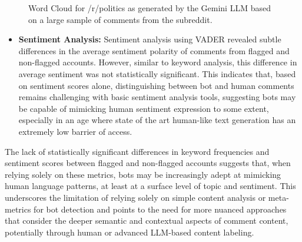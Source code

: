 \documentclass[
  12pt,
  letterpaper,
  DIV=11,
  numbers=noendperiod,
  abstract]{scrartcl}
\providecommand{\tightlist}{%
  \setlength{\itemsep}{0pt}\setlength{\parskip}{0pt}}\usepackage{longtable,booktabs,array}
\begin{document}
\begin{figure}


\caption{\label{fig-polwc}Word Cloud for /r/politics as generated by the
Gemini LLM based on a large sample of comments from the subreddit.}

\end{figure}%

\begin{itemize}
\tightlist
\item
  \textbf{Sentiment Analysis:} Sentiment analysis using VADER revealed
  subtle differences in the average sentiment polarity of comments from
  flagged and non-flagged accounts. However, similar to keyword
  analysis, this difference in average sentiment was not statistically
  significant. This indicates that, based on sentiment scores alone,
  distinguishing between bot and human comments remains challenging with
  basic sentiment analysis tools, suggesting bots may be capable of
  mimicking human sentiment expression to some extent, especially in an
  age where state of the art human-like text generation has an extremely
  low barrier of access.
\end{itemize}

The lack of statistically significant differences in keyword frequencies
and sentiment scores between flagged and non-flagged accounts suggests
that, when relying solely on these metrics, bots may be increasingly
adept at mimicking human language patterns, at least at a surface level
of topic and sentiment. This underscores the limitation of relying
solely on simple content analysis or meta-metrics for bot detection and
points to the need for more nuanced approaches that consider the deeper
semantic and contextual aspects of comment content, potentially through
human or advanced LLM-based content labeling.
\end{document}
